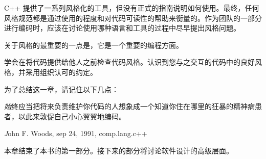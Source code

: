 C++ 提供了一系列风格化的工具，但没有正式的指南说明如何使用。最终，任何风格规范都是通过使用的程度和对代码可读性的帮助来衡量的。作为团队的一部分进行编码时，应该在讨论使用哪种语言和工具的过程中尽早提出风格问题。

关于风格的最重要的一点是，它是一个重要的编程方面。

学会在将代码提供给他人之前检查代码风格。认识到您与之交互的代码中的良好风格，并采用组织认可的约定。

为了总结这一章，请记住以下几点：

\begin{center}
\textit
始终应当把将来负责维护你代码的人想象成一个知道你住在哪里的狂暴的精神病患者，以此来敦促自己小心翼翼地编码。
\end{center}

\begin{flushright}
\textit
John F. Woods, sep 24, 1991, comp.lang.c++
\end{flushright}

本章结束了本书的第一部分。接下来的部分将讨论软件设计的高级层面。

